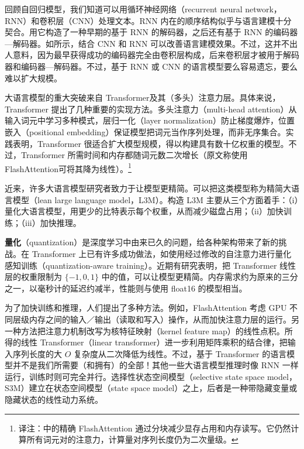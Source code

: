 回顾自回归模型，我们知道可以用循环神经网络（recurrent neural network，RNN）和卷积层（CNN）处理文本。RNN 内在的顺序结构似乎与语言建模十分契合。用它构造了一种早期的基于 RNN 的解码器，之后还有基于 RNN 的编码器—解码器。如所示，结合 CNN 和 RNN 可以改善语言建模效果。不过，这并不出人意料，因为最早获得成功的编码器完全由卷积层构成，后来卷积层才被用于解码器和编码器—解码器。不过，基于 RNN 或 CNN 的语言模型要么容易遗忘，要么难以扩大规模。

大语言模型的重大突破来自 Transformer及其（多头）注意力层。具体来说，Transformer 提出了几种重要的实现方法。多头注意力（multi-head attention）从输入词元中学习多种模式，层归一化（layer normalization）防止梯度爆炸，位置嵌入（positional embedding）保证模型把词元当作序列处理，而非无序集合。实践表明，Transformer 很适合扩大模型规模，得以构建具有数十亿权重的模型。不过，Transformer 所需时间和内存都随词元数二次增长（原文称使用 FlashAttention可将其降为线性）。\footnote{译注：中的精确 FlashAttention 通过分块减少显存占用和内存读写。它仍然计算所有词元对的注意力，计算量对序列长度仍为二次量级。}

近来，许多大语言模型研究者致力于让模型更精简。可以把这类模型称为精简大语言模型（lean large language model，L3M）。构造 L3M 主要从三个方面着手：（i）量化大语言模型，用更少的比特表示每个权重，从而减少磁盘占用；（ii）加快训练；（iii）加快推理。

\textbf{量化}（quantization）是深度学习中由来已久的问题，给各种架构带来了新的挑战。在 Transformer 上已有许多成功做法，如使用经过修改的自注意力进行量化感知训练（quantization-aware training）。近期有研究表明，把 Transformer 线性层的权重限制为 $\{-1,0,1\}$ 中的值，可以让模型更精简。内存需求约为原来的三分之一，以毫秒计的延迟约减半，性能则与使用 float16 的模型相当。

为了加快训练和推理，人们提出了多种方法。例如，FlashAttention 考虑 GPU 不同层级内存之间的输入／输出（读取和写入）操作，从而加快注意力层的运行。另一种方法把注意力机制改写为核特征映射（kernel feature map）的线性点积。所得的线性 Transformer（linear transformer）进一步利用矩阵乘积的结合律，把输入序列长度的大 $O$ 复杂度从二次降低为线性。不过，基于 Transformer 的语言模型并不是我们所需要（和拥有）的全部！其他一些大语言模型推理时像 RNN 一样运行，训练时则可完全并行。选择性状态空间模型（selective state space model，S3M）建立在状态空间模型（state space model）之上，后者是一种带隐藏变量或隐藏状态的线性动力系统。

